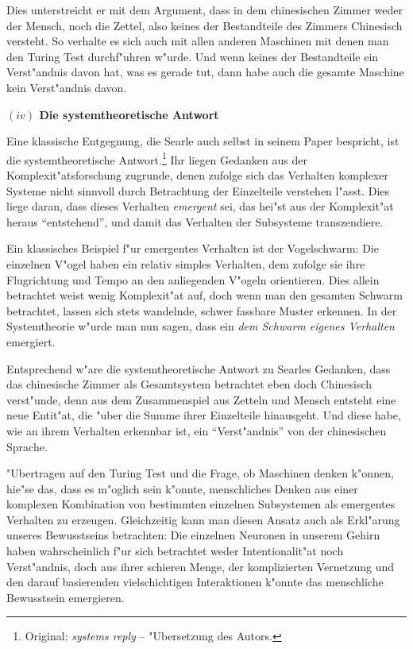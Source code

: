 \documentclass[a4paper, emulatestandardclasses, 12pt]{scrartcl}
\begin{document}
\begin{onehalfspace}
Dies unterstreicht er mit dem Argument, dass in dem chinesischen Zimmer weder der Mensch, noch die Zettel, also keines der Bestandteile des Zimmers Chinesisch versteht. So verhalte es sich auch mit allen anderen Maschinen mit denen man den Turing Test durchf"uhren w"urde. Und wenn keines der Bestandteile ein Verst"andnis davon hat, was es gerade tut, dann habe auch die gesamte Maschine kein Verst"andnis davon.

\vspace{5mm}
\noindent\textbf{$(iv)$ Die systemtheoretische Antwort}

\noindent Eine klassische Entgegnung, die Searle auch selbst in seinem Paper bespricht, ist die systemtheoretische Antwort.\footnote{Original: \emph{systems reply} --  "Ubersetzung des Autors.} Ihr liegen Gedanken aus der Komplexit"atsforschung zugrunde, denen zufolge sich das Verhalten komplexer Systeme nicht sinnvoll durch Betrachtung der Einzelteile verstehen l"asst. Dies liege daran, dass dieses Verhalten \emph{emergent} sei, das hei"st aus der Komplexit"at heraus "`entstehend"', und damit das Verhalten der Subsysteme transzendiere. 

Ein klassisches Beispiel f"ur emergentes Verhalten ist der Vogelschwarm: Die einzelnen V"ogel haben ein relativ simples Verhalten, dem zufolge sie ihre Flugrichtung und Tempo an den anliegenden V"ogeln orientieren. Dies allein betrachtet weist wenig Komplexit"at auf, doch wenn man den gesamten Schwarm betrachtet, lassen sich stets wandelnde, schwer fassbare Muster erkennen. In der Systemtheorie w"urde man nun sagen, dass ein \emph{dem Schwarm eigenes Verhalten} emergiert.

Entsprechend w"are die systemtheoretische Antwort zu Searles Gedanken, dass das chinesische Zimmer als Gesamtsystem betrachtet eben doch Chinesisch verst"unde, denn aus dem Zusammenspiel aus Zetteln und Mensch entsteht eine neue Entit"at, die "uber die Summe ihrer Einzelteile hinausgeht. Und diese habe, wie an ihrem Verhalten erkennbar ist, ein "`Verst"andnis"' von der chinesischen Sprache.

"Ubertragen auf den Turing Test und die Frage, ob Maschinen denken k"onnen, hie"se das, dass es m"oglich sein k"onnte, menschliches Denken aus einer komplexen Kombination von bestimmten einzelnen Subsystemen als emergentes Verhalten zu erzeugen. Gleichzeitig kann man diesen Ansatz auch als Erkl"arung unseres Bewusstseins betrachten: Die einzelnen Neuronen in unserem Gehirn haben wahrscheinlich f"ur sich betrachtet weder Intentionalit"at noch Verst"andnis, doch aus ihrer schieren Menge, der komplizierten Vernetzung und den darauf basierenden vielschichtigen Interaktionen k"onnte das menschliche Bewusstsein emergieren.


\end{onehalfspace}
\end{document}
